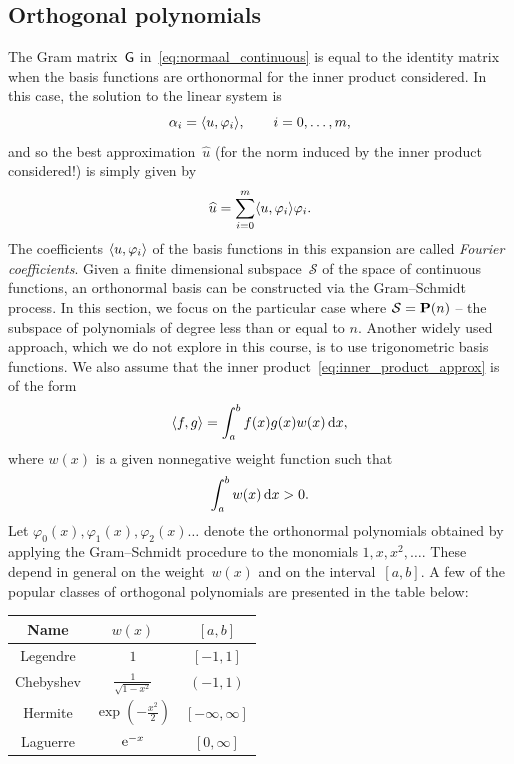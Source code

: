 \subsection{Orthogonal polynomials}
The Gram matrix~$\mathsf G$ in~\eqref{eq:normaal_continuous} is equal to the identity matrix when the basis functions are orthonormal for the inner product considered.
In this case, the solution to the linear system is
\[
    \alpha_i = \langle u, \varphi_i\rangle, \qquad i = 0, \dotsc, m,
\]
and so the best approximation~$\widehat u$ (for the norm induced by the inner product considered!) is simply given by
\[
    \widehat u = \sum_{i=0}^{m} \langle u, \varphi_i\rangle \varphi_i.
\]
The coefficients $\langle u, \varphi_i\rangle$ of the basis functions in this expansion are called \emph{Fourier coefficients}.
Given a finite dimensional subspace~$\mathcal S$ of the space of continuous functions,
an orthonormal basis can be constructed via the Gram--Schmidt process.
In this section, we focus on the particular case where $\mathcal S = \mathbf P(n)$
-- the subspace of polynomials of degree less than or equal to $n$.
Another widely used approach,
which we do not explore in this course,
is to use trigonometric basis functions.
We also assume that the inner product~\eqref{eq:inner_product_approx} is of the form
\begin{equation}
    \label{eq:ip_weighted}
    \langle f,g\rangle
    = \int_{a}^{b} f(x) g(x) w(x) \, \mathrm d x,
\end{equation}
where $w(x)$ is a given nonnegative weight function such that
\[
    \int_{a}^{b} w(x) \, \mathrm d x > 0.
\]
Let $\varphi_0(x), \varphi_1(x), \varphi_2(x) \dotsc$ denote the orthonormal polynomials obtained by applying the Gram--Schmidt procedure to the monomials $1, x, x^2, \dotsc$.
These depend in general on the weight~$w(x)$ and on the interval~$[a, b]$.
A few of the popular classes of orthogonal polynomials are presented in the table below:
\begin{center}
    \def\arraystretch{1.5}
    \begin{tabular}{|c|c|c|}
        \hline
        \textbf{Name} & $w(x)$  & $[a, b]$ \\ \hline
        Legendre & $1$  & $[-1, 1]$ \\ \hline
        Chebyshev & $\frac{1}{\sqrt{1 - x^2}}$  & $(-1, 1)$ \\ \hline
        Hermite & $\exp \left( - \frac{x^2}{2} \right)$  & $[-\infty, \infty]$ \\ \hline
        Laguerre & $\mathrm e^{-x}$  & $[0, \infty]$ \\ \hline
    \end{tabular}
\end{center}

